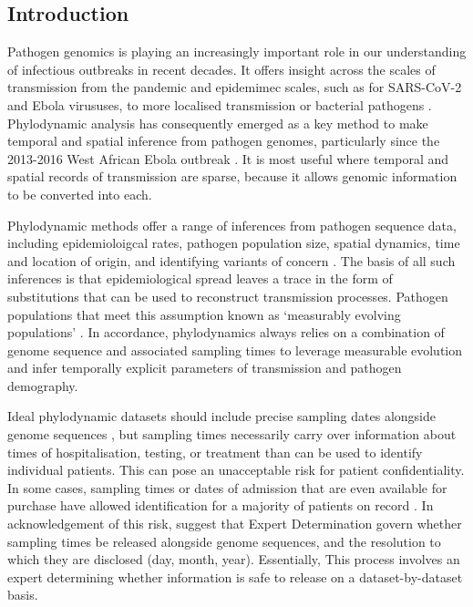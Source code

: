 \documentclass{article}
\begin{document}
\begin{spacing}{1.5}
\section*{Introduction}
Pathogen genomics is playing an increasingly important role in our understanding of infectious outbreaks in recent decades. It offers insight across the scales of transmission from the pandemic and epidemimec scales, such as for SARS-CoV-2 and Ebola virususes, to more localised transmission or bacterial pathogens \citep{lancet2021genomic}. Phylodynamic analysis has consequently emerged as a key method to make temporal and spatial inference from pathogen genomes, particularly since the 2013-2016 West African Ebola outbreak \citep{mbala2019medical}. It is most useful where temporal and spatial records of transmission are sparse, because it allows genomic information to be converted into each.

Phylodynamic methods offer a range of inferences from pathogen sequence data, including epidemioloigcal rates, pathogen population size, spatial dynamics, time and location of origin, and identifying variants of concern \citep{featherstone2022epidemiological, attwood2022phylogenetic, du2015getting,volz_fitness_2023}. The basis of all such inferences is that epidemiological spread leaves a trace in the form of substitutions that can be used to reconstruct transmission processes. Pathogen populations that meet this assumption known as `measurably evolving populations' \citep{drummond2003measurably, biek_measurably_2015}. In accordance, phylodynamics always relies on a combination of genome sequence and associated sampling times to leverage measurable evolution and infer temporally explicit parameters of transmission and pathogen demography.

Ideal phylodynamic datasets should include precise sampling dates alongside genome sequences \citep{black2020ten}, but sampling times necessarily carry over information about times of hospitalisation, testing, or treatment than can be used to identify individual patients. This can pose an unacceptable risk for patient confidentiality. In some cases, sampling times or dates of admission that are even available for purchase have allowed identification for a majority of patients on record \citep{sweeney_matching_2013,shean_private_2018}. In acknowledgement of this risk, \citet{shean_private_2018} suggest that Expert Determination govern whether sampling times be released alongside genome sequences, and the resolution to which they are disclosed (day, month, year). Essentially, This process involves an expert determining whether information is safe to release on a dataset-by-dataset basis.


\end{spacing}
\end{document}
